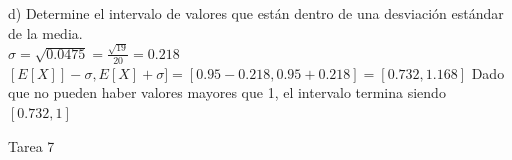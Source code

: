 \documentclass[a4paper, 12pt]{article}
\newcommand{\Aspace}{0.2cm}
\begin{document}
\begin{enumerate}
            \vspace{\Aspace} \par
            d) Determine el intervalo de valores que están dentro de una desviación estándar de la media.
            \\ { \color{azul}
            $\sigma = \sqrt{0.0475} = \frac{\sqrt{19}}{20} = 0{.}218$ \vspace{0.1cm}
            \newline $[E[X]] - \sigma, E[X] + \sigma] = [0{.}95 - 0{.}218, 0{.}95 + 0{.}218] = [0{.}732, 1{.}168]$ \vspace{0.1cm}
            \newline Dado que no pueden haber valores mayores que 1, el intervalo termina siendo $[0{.}732, 1]$
            }
    \end{enumerate}



    \newpage
    \begin{center}
        { \LARGE Tarea 7}
    \end{center}
\end{document}
